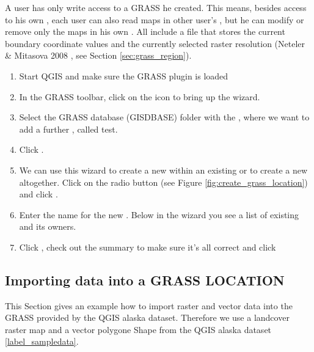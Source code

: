 A user has only write access to a GRASS  he created. This 
means, besides access to his own , each user can also read 
maps in other user's , but he can modify or remove only 
the maps in his own . All  include a 
 file that stores the current boundary coordinate values and 
the currently selected raster resolution (Neteler \& Mitasova 2008 
\cite{neteler_mitasova08}, see Section \ref{sec:grass_region}). 

\begin{enumerate}
  \item Start QGIS and make sure the GRASS plugin is loaded
  \item In the GRASS toolbar, click on the 
   icon to bring up the 
   wizard.
  \item Select the GRASS database (GISDBASE) folder  
  with the , where we want to add a further 
  , called test.
  \item Click . 
  \item We can use this wizard to create a new  within an 
  existing  or to create a new  
  altogether. Click on the radio button  
  (see Figure \ref{fig:create_grass_location}) and click .
  \item Enter the name  for the new . Below 
  in the wizard you see a list of existing  and its owners.
  \item Click , check out the summary to make sure it's all 
  correct and click  
\end{enumerate}

\subsection{Importing data into a GRASS LOCATION}\label{sec:import_loc_data}

This Section gives an example how to import raster and vector data into the 
 GRASS  provided by the QGIS alaska 
dataset. Therefore we use a landcover raster map  
and a vector polygone Shape  from the QGIS alaska 
dataset \ref{label_sampledata}.

